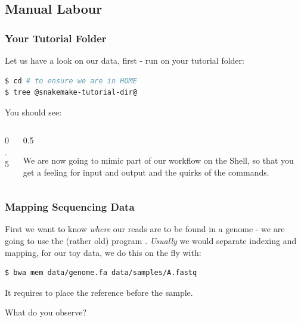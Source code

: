 \subsection{Manual Labour}

\begin{frame}[fragile]
	\frametitle{Your Tutorial Folder}
	Let us have a look on our data, first - run  on your tutorial folder:
	\begin{lstlisting}[language=Bash, style=Shell]
$ cd # to ensure we are in HOME
$ tree @snakemake-tutorial-dir@
    \end{lstlisting}
    You should see:
    \begin{columns}
    	\begin{column}{0.5\textwidth}
    		
    		\begin{minipage}[t]{0.5\textwidth}
    			{\tiny \DTsetlength{0.2em}{1em}{0.2em}{0.4pt}{.6pt}
    				}
    		\end{minipage}
    	\end{column}
    	\begin{column}{0.5\textwidth}
    		\pause
    		\begin{task}
    			We are now going to mimic part of our workflow on the Shell, so that you get a feeling for input and output and the quirks of the commands.
    		\end{task}
    	\end{column}
    \end{columns}
\end{frame}

\begin{frame}[fragile]
  \frametitle{Mapping Sequencing Data}
  \begin{task}
  	First we want to know \emph{where} our reads are to be found in a genome - we are going to use the (rather old) program .\newline
  	\emph{Usually} we would separate indexing and mapping, for our toy data, we do this on the fly with:
  \end{task}
  \pause
  	\begin{lstlisting}[language=Bash, style=Shell]
$ bwa mem data/genome.fa data/samples/A.fastq
    \end{lstlisting}
    It requires to place the reference before the sample.
    \begin{question}
    	What do you observe?
    \end{question}
\end{frame}

